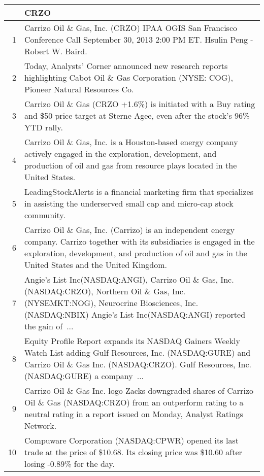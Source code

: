 \documentclass{tufte-handout}\usepackage[]{graphicx}\usepackage[]{color}
\begin{document}
\begin{tabularx}{\textwidth}{rX}
  \hline
 & CRZO \\ 
  \hline
1 &  Carrizo Oil \& Gas, Inc. (CRZO) IPAA OGIS San Francisco Conference Call September 30, 2013 2:00 PM ET. Hsulin Peng - Robert W. Baird.  \\ 
  2 &  Today, Analysts' Corner announced new research reports highlighting Cabot Oil \& Gas Corporation (NYSE: COG), Pioneer Natural Resources Co.  \\ 
  3 &  Carrizo Oil \& Gas (CRZO +1.6\%) is initiated with a Buy rating and \$50 price target at Sterne Agee, even after the stock's 96\% YTD rally.  \\ 
  4 &  Carrizo Oil \& Gas, Inc. is a Houston-based energy company actively engaged in the exploration, development, and production of oil and gas from resource plays located in the United States.  \\ 
  5 &  LeadingStockAlerts is a financial marketing firm that specializes in assisting the underserved small cap and micro-cap stock community.  \\ 
  6 &  Carrizo Oil \& Gas, Inc. (Carrizo) is an independent energy company. Carrizo together with its subsidiaries is engaged in the exploration, development, and production of oil and gas in the United States and the United Kingdom.  \\ 
  7 &  Angie's List Inc(NASDAQ:ANGI), Carrizo Oil \& Gas, Inc.(NASDAQ:CRZO), Northern Oil \& Gas, Inc.(NYSEMKT:NOG), Neurocrine Biosciences, Inc.(NASDAQ:NBIX) Angie's List Inc(NASDAQ:ANGI) reported the gain of ...  \\ 
  8 &  Equity Profile Report expands its NASDAQ Gainers Weekly Watch List adding Gulf Resources, Inc. (NASDAQ:GURE) and Carrizo Oil \& Gas Inc. (NASDAQ:CRZO). Gulf Resources, Inc. (NASDAQ:GURE) a company ...  \\ 
  9 &  Carrizo Oil \& Gas Inc. logo Zacks downgraded shares of Carrizo Oil \& Gas (NASDAQ:CRZO) from an outperform rating to a neutral rating in a report issued on Monday, Analyst Ratings Network.  \\ 
  10 &  Compuware Corporation (NASDAQ:CPWR) opened its last trade at the price of \$10.68. Its closing price was \$10.60 after losing -0.89\% for the day.  \\ 
   \hline
\end{tabularx}
\end{document}
